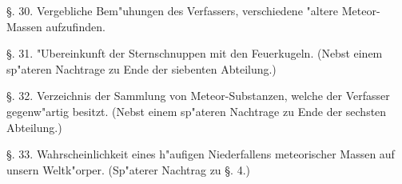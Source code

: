 \documentclass[a4paper, 11pt, oneside, polutonikogreek, german]{article}
\begin{document}
§. 30. Vergebliche Bem"uhungen des Verfassers, verschiedene "altere Meteor-Massen aufzufinden.

§. 31. "Ubereinkunft der Sternschnuppen mit den Feuerkugeln. (Nebst einem sp"ateren Nachtrage zu Ende der siebenten Abteilung.)

§. 32. Verzeichnis der Sammlung von Meteor-Substanzen, welche der Verfasser gegenw"artig besitzt. (Nebst einem sp"ateren Nachtrage zu Ende der sechsten Abteilung.)

§. 33. Wahrscheinlichkeit eines h"aufigen Niederfallens meteorischer Massen auf unsern Weltk"orper. (Sp"aterer Nachtrag zu §. 4.)

\subsection*{}

\subsection*{}
\subsubsection*{}
\end{document}

